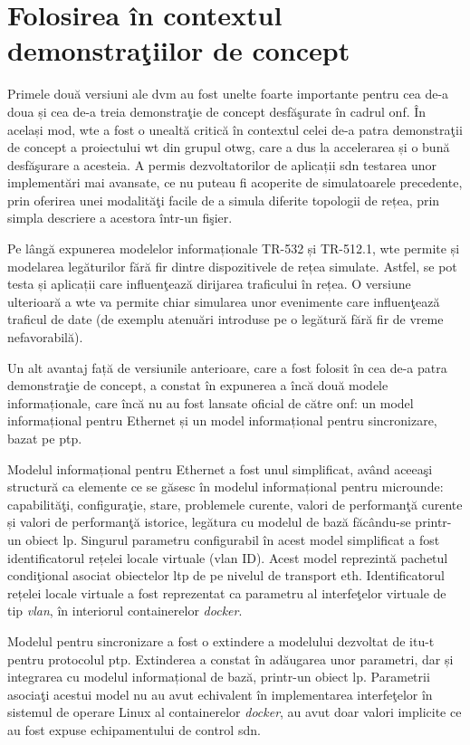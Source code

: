 \section{Folosirea în contextul demonstraţiilor de concept}

Primele două versiuni ale \gls{dvm} au fost unelte foarte importante pentru cea de-a doua și cea de-a treia demonstraţie de concept desfăşurate în cadrul \gls{onf}. În același mod, \gls{wte} a fost o unealtă critică în contextul celei de-a patra demonstraţii de concept a proiectului \gls{wt} din grupul \gls{otwg}, care a dus la accelerarea și o bună desfăşurare a acesteia. A permis dezvoltatorilor de aplicații \gls{sdn} testarea unor implementări mai avansate, ce nu puteau fi acoperite de simulatoarele precedente, prin oferirea unei modalităţi facile de a simula diferite topologii de rețea, prin simpla descriere a acestora într-un fişier.

Pe lângă expunerea modelelor informaționale TR-532 și TR-512.1, \gls{wte} permite și modelarea legăturilor fără fir dintre dispozitivele de rețea simulate. Astfel, se pot testa și aplicații care influenţează dirijarea traficului în rețea. O versiune ulterioară a \gls{wte} va permite chiar simularea unor evenimente care influenţează traficul de date (de exemplu atenuări introduse pe o legătură fără fir de vreme nefavorabilă).

Un alt avantaj față de versiunile anterioare, care a fost folosit în cea de-a patra demonstraţie de concept, a constat în expunerea a încă două modele informaționale, care încă nu au fost lansate oficial de către \gls{onf}: un model informațional pentru Ethernet și un model informațional pentru sincronizare, bazat pe \gls{ptp}.

Modelul informațional pentru Ethernet a fost unul simplificat, având aceeaşi structură ca elemente ce se găsesc în modelul informațional pentru microunde: capabilităţi, configuraţie, stare, problemele curente, valori de performanţă curente și valori de performanţă istorice, legătura cu modelul de bază făcându-se printr-un obiect \gls{lp}. Singurul parametru configurabil în acest model simplificat a fost identificatorul rețelei locale virtuale (\gls{vlan} ID). Acest model reprezintă pachetul condiţional asociat obiectelor \gls{ltp} de pe nivelul de transport \gls{eth}. Identificatorul rețelei locale virtuale a fost reprezentat ca parametru al interfeţelor virtuale de tip \textit{vlan}, în interiorul containerelor \textit{docker}.

Modelul pentru sincronizare a fost o extindere a modelului dezvoltat de \gls{itu-t} pentru protocolul \gls{ptp}. Extinderea a constat în adăugarea unor parametri, dar și integrarea cu modelul informațional de bază, printr-un obiect \gls{lp}. Parametrii asociaţi acestui model nu au avut echivalent în implementarea interfeţelor în sistemul de operare Linux al containerelor \textit{docker}, au avut doar valori implicite ce au fost expuse echipamentului de control \gls{sdn}.

